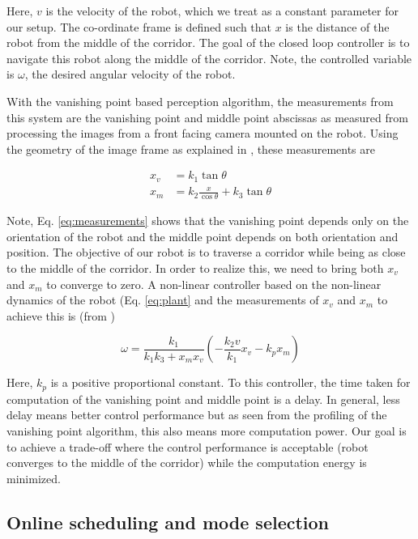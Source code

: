 Here, $v$ is the velocity of the robot, which we treat as a constant parameter for our setup. The co-ordinate frame is defined such that $x$ is the distance of the robot from the middle of the corridor. The goal of the closed loop controller is to navigate this robot along the middle of the corridor. Note, the controlled variable is $\omega$, the desired angular velocity of the robot.

With the vanishing point based perception algorithm, the measurements from this system are the vanishing point and middle point abscissas as measured from processing the images from a front facing camera mounted on the robot. Using the geometry of the image frame as explained in \cite{VP2}, these measurements are

\begin{subequations}
\begin{align}
x_v &= k_1\tan\theta \nonumber \\
x_m &= k_2\frac{x}{\cos\theta} + k_3\tan\theta
\end{align}
\label{eq:measurements}
\end{subequations}

Note, Eq. \ref{eq:measurements} shows that the vanishing point depends only on the orientation of the robot and the middle point depends on both orientation and position. The objective of our robot is to traverse a corridor while being as close to the middle of the corridor. In order to realize this, we need to bring both $x_v$ and $x_m$ to converge to zero. A non-linear controller based on the non-linear dynamics of the robot (Eq. \ref{eq:plant} and the measurements of $x_v$ and $x_m$ to achieve this is (from \cite{VP2})

\begin{equation}
\omega = \frac{k_1}{k_1k_3+x_mx_v}(-\frac{k_2v}{k_1}x_v -k_px_m)
\label{eq:controller}
\end{equation}

Here, $k_p$ is a positive proportional constant. To this controller, the time taken for computation of the vanishing point and middle point is a delay. In general, less delay means better control performance but as seen from the profiling of the vanishing point algorithm, this also means more computation power. Our goal is to achieve a trade-off where the control performance is acceptable (robot converges to the middle of the corridor) while the computation energy is minimized. 

\subsection{Online scheduling and mode selection}

